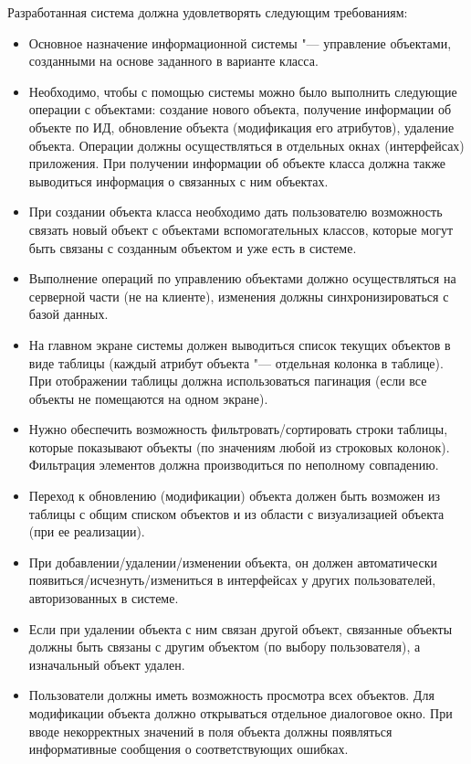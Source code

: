 \documentclass[a4paper,12pt]{article}
\begin{document}
Разработанная система должна удовлетворять следующим требованиям:
\begin{itemize}
  \item Основное назначение информационной системы "--- управление объектами, созданными на основе заданного в варианте класса.
  \item Необходимо, чтобы с помощью системы можно было выполнить следующие операции с объектами: создание нового объекта, получение информации об объекте по ИД, обновление объекта (модификация его атрибутов), удаление объекта. Операции должны осуществляться в отдельных окнах (интерфейсах) приложения. При получении информации об объекте класса должна также выводиться информация о связанных с ним объектах.
  \item При создании объекта класса необходимо дать пользователю возможность связать новый объект с объектами вспомогательных классов, которые могут быть связаны с созданным объектом и уже есть в системе.
  \item Выполнение операций по управлению объектами должно осуществляться на серверной части (не на клиенте), изменения должны синхронизироваться с базой данных.
  \item На главном экране системы должен выводиться список текущих объектов в виде таблицы (каждый атрибут объекта "--- отдельная колонка в таблице). При отображении таблицы должна использоваться пагинация (если все объекты не помещаются на одном экране).
  \item Нужно обеспечить возможность фильтровать/сортировать строки таблицы, которые показывают объекты (по значениям любой из строковых колонок). Фильтрация элементов должна производиться по неполному совпадению.
  \item Переход к обновлению (модификации) объекта должен быть возможен из таблицы с общим списком объектов и из области с визуализацией объекта (при ее реализации).
  \item При добавлении/удалении/изменении объекта, он должен автоматически появиться/исчезнуть/измениться в интерфейсах у других пользователей, авторизованных в системе.
  \item Если при удалении объекта с ним связан другой объект, связанные объекты должны быть связаны с другим объектом (по выбору пользователя), а изначальный объект удален.
  \item Пользователи должны иметь возможность просмотра всех объектов. Для модификации объекта должно открываться отдельное диалоговое окно. При вводе некорректных значений в поля объекта должны появляться информативные сообщения о соответствующих ошибках.
\end{itemize}
\end{document}
